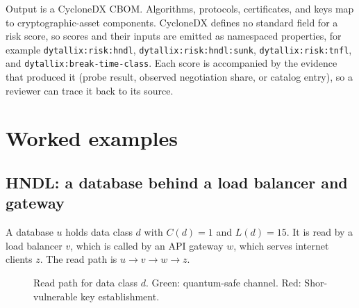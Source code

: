\documentclass[conference]{IEEEtran}
\begin{document}
Output is a CycloneDX CBOM. Algorithms, protocols, certificates, and keys map to cryptographic-asset components. CycloneDX defines no standard field for a risk score, so scores and their inputs are emitted as namespaced properties, for example \texttt{dytallix:risk:hndl}, \texttt{dytallix:risk:hndl:sunk}, \texttt{dytallix:risk:tnfl}, and \texttt{dytallix:break-time-class}. Each score is accompanied by the evidence that produced it (probe result, observed negotiation share, or catalog entry), so a reviewer can trace it back to its source.

\section{Worked examples}\label{sec:10}

\subsection{HNDL: a database behind a load balancer and gateway}\label{sec:10.1}

A database $u$ holds data class $d$ with $C(d) = 1$ and $L(d) = 15$. It is read by a load balancer $v$, which is called by an API gateway $w$, which serves internet clients $z$. The read path is $u \to v \to w \to z$.
\begin{figure}[!t]
\centering
{}
\caption{Read path for data class $d$. Green: quantum-safe channel. Red: Shor-vulnerable key establishment.}\label{fig:1}
\end{figure}
\end{document}
